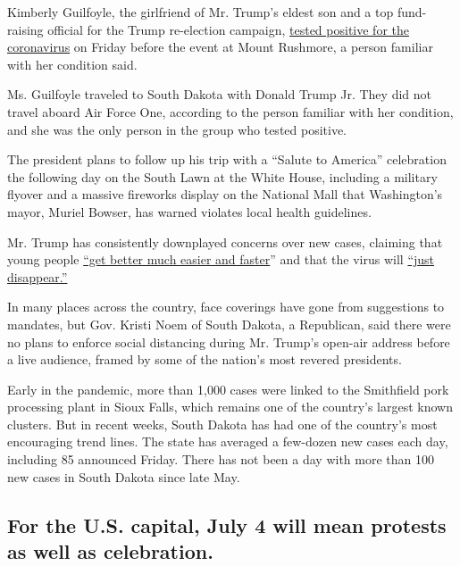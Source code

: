 Kimberly Guilfoyle, the girlfriend of Mr. Trump's eldest son and a top
fund-raising official for the Trump re-election campaign,
\href{https://www.nytimes3xbfgragh.onion/2020/07/03/us/politics/kimberly-guilfoyle-trump-campaign-coronavirus.html}{tested
positive for the coronavirus} on Friday before the event at Mount
Rushmore, a person familiar with her condition said.

Ms. Guilfoyle traveled to South Dakota with Donald Trump Jr. They did
not travel aboard Air Force One, according to the person familiar with
her condition, and she was the only person in the group who tested
positive.

The president plans to follow up his trip with a ``Salute to America''
celebration the following day on the South Lawn at the White House,
including a military flyover and a massive fireworks display on the
National Mall that Washington's mayor, Muriel Bowser, has warned
violates local health guidelines.

Mr. Trump has consistently downplayed concerns over new cases, claiming
that young people
\href{https://twitter.com/realDonaldTrump/status/1278897430378041344}{``get
better much easier and faster}'' and that the virus will
\href{https://www.nbcnews.com/politics/white-house/trump-says-he-thinks-coronavirus-will-just-disappear-despite-rising-n1232709}{``just
disappear.''}

In many places across the country, face coverings have gone from
suggestions to mandates, but Gov. Kristi Noem of South Dakota, a
Republican, said there were no plans to enforce social distancing during
Mr. Trump's open-air address before a live audience, framed by some of
the nation's most revered presidents.

Early in the pandemic, more than 1,000 cases were linked to the
Smithfield pork processing plant in Sioux Falls, which remains one of
the country's largest known clusters. But in recent weeks, South Dakota
has had one of the country's most encouraging trend lines. The state has
averaged a few-dozen new cases each day, including 85 announced Friday.
There has not been a day with more than 100 new cases in South Dakota
since late May.

\hypertarget{for-the-us-capital-july-4-will-mean-protests-as-well-as-celebration}{%
\subsection{For the U.S. capital, July 4 will mean protests as well as
celebration.}\label{for-the-us-capital-july-4-will-mean-protests-as-well-as-celebration}}

